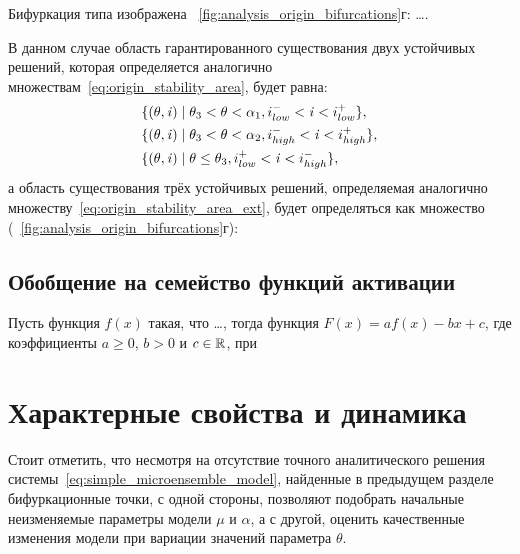 Бифуркация типа  изображена \onfigure~\ref{fig:analysis_origin_bifurcations}г: \ldots . 

В данном случае область гарантированного существования двух устойчивых решений, которая определяется аналогично множествам~\eqref{eq:origin_stability_area}, будет равна:
\begin{equation}
    \nonumber
    \begin{aligned}
        &\{ (\theta, \mathit{i}) \mid \theta_{3} < \theta < \alpha_{1}, i^{-}_{low} < \mathit{i} < i^{+}_{low} \}, \\
        &\{ (\theta, \mathit{i}) \mid \theta_{3} < \theta < \alpha_{2}, i^{-}_{high} < \mathit{i} < i^{+}_{high} \}, \\
        &\{ (\theta, \mathit{i}) \mid \theta \le \theta_{3}, i^{+}_{low} < \mathit{i} < i^{-}_{high} \}, \\
    \end{aligned}
\end{equation}
а область существования трёх устойчивых решений, определяемая аналогично множеству~\eqref{eq:origin_stability_area_ext}, будет определяться как множество (\seefigure~\ref{fig:analysis_origin_bifurcations}г):


\newpage
\subsection{Обобщение на семейство функций активации}  \label{subsection:analysis_custom}

\begin{Lemma}
    Пусть функция $f(x)$ такая, что \ldots, тогда функция $F(x) = a f(x) - b x + c$, где коэффициенты $a \ge 0$, $b > 0$ и $c \in \mathbb{R}$, при
\end{Lemma}


\newpage
\section{Характерные свойства и динамика} \label{section:neuron_dynamic}

Стоит отметить, что несмотря на отсутствие точного аналитического решения системы~\eqref{eq:simple_microensemble_model}, найденные в предыдущем разделе бифуркационные точки, с одной стороны, позволяют подобрать начальные неизменяемые параметры модели $\mu$ и $\alpha$, а с другой, оценить качественные изменения модели при вариации значений параметра $\theta$.

